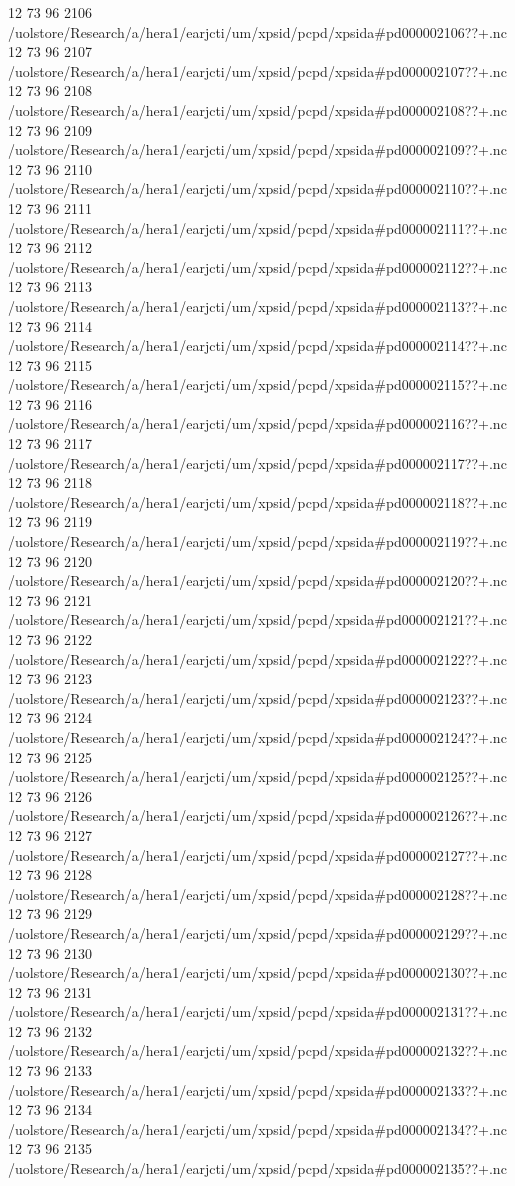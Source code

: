 12 73 96
2106
/uolstore/Research/a/hera1/earjcti/um/xpsid/pcpd/xpsida#pd000002106??+.nc
12 73 96
2107
/uolstore/Research/a/hera1/earjcti/um/xpsid/pcpd/xpsida#pd000002107??+.nc
12 73 96
2108
/uolstore/Research/a/hera1/earjcti/um/xpsid/pcpd/xpsida#pd000002108??+.nc
12 73 96
2109
/uolstore/Research/a/hera1/earjcti/um/xpsid/pcpd/xpsida#pd000002109??+.nc
12 73 96
2110
/uolstore/Research/a/hera1/earjcti/um/xpsid/pcpd/xpsida#pd000002110??+.nc
12 73 96
2111
/uolstore/Research/a/hera1/earjcti/um/xpsid/pcpd/xpsida#pd000002111??+.nc
12 73 96
2112
/uolstore/Research/a/hera1/earjcti/um/xpsid/pcpd/xpsida#pd000002112??+.nc
12 73 96
2113
/uolstore/Research/a/hera1/earjcti/um/xpsid/pcpd/xpsida#pd000002113??+.nc
12 73 96
2114
/uolstore/Research/a/hera1/earjcti/um/xpsid/pcpd/xpsida#pd000002114??+.nc
12 73 96
2115
/uolstore/Research/a/hera1/earjcti/um/xpsid/pcpd/xpsida#pd000002115??+.nc
12 73 96
2116
/uolstore/Research/a/hera1/earjcti/um/xpsid/pcpd/xpsida#pd000002116??+.nc
12 73 96
2117
/uolstore/Research/a/hera1/earjcti/um/xpsid/pcpd/xpsida#pd000002117??+.nc
12 73 96
2118
/uolstore/Research/a/hera1/earjcti/um/xpsid/pcpd/xpsida#pd000002118??+.nc
12 73 96
2119
/uolstore/Research/a/hera1/earjcti/um/xpsid/pcpd/xpsida#pd000002119??+.nc
12 73 96
2120
/uolstore/Research/a/hera1/earjcti/um/xpsid/pcpd/xpsida#pd000002120??+.nc
12 73 96
2121
/uolstore/Research/a/hera1/earjcti/um/xpsid/pcpd/xpsida#pd000002121??+.nc
12 73 96
2122
/uolstore/Research/a/hera1/earjcti/um/xpsid/pcpd/xpsida#pd000002122??+.nc
12 73 96
2123
/uolstore/Research/a/hera1/earjcti/um/xpsid/pcpd/xpsida#pd000002123??+.nc
12 73 96
2124
/uolstore/Research/a/hera1/earjcti/um/xpsid/pcpd/xpsida#pd000002124??+.nc
12 73 96
2125
/uolstore/Research/a/hera1/earjcti/um/xpsid/pcpd/xpsida#pd000002125??+.nc
12 73 96
2126
/uolstore/Research/a/hera1/earjcti/um/xpsid/pcpd/xpsida#pd000002126??+.nc
12 73 96
2127
/uolstore/Research/a/hera1/earjcti/um/xpsid/pcpd/xpsida#pd000002127??+.nc
12 73 96
2128
/uolstore/Research/a/hera1/earjcti/um/xpsid/pcpd/xpsida#pd000002128??+.nc
12 73 96
2129
/uolstore/Research/a/hera1/earjcti/um/xpsid/pcpd/xpsida#pd000002129??+.nc
12 73 96
2130
/uolstore/Research/a/hera1/earjcti/um/xpsid/pcpd/xpsida#pd000002130??+.nc
12 73 96
2131
/uolstore/Research/a/hera1/earjcti/um/xpsid/pcpd/xpsida#pd000002131??+.nc
12 73 96
2132
/uolstore/Research/a/hera1/earjcti/um/xpsid/pcpd/xpsida#pd000002132??+.nc
12 73 96
2133
/uolstore/Research/a/hera1/earjcti/um/xpsid/pcpd/xpsida#pd000002133??+.nc
12 73 96
2134
/uolstore/Research/a/hera1/earjcti/um/xpsid/pcpd/xpsida#pd000002134??+.nc
12 73 96
2135
/uolstore/Research/a/hera1/earjcti/um/xpsid/pcpd/xpsida#pd000002135??+.nc
